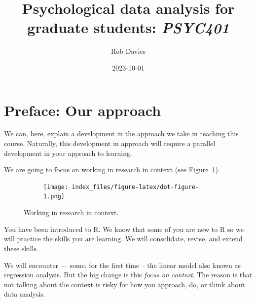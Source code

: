 \documentclass[
  letterpaper,
  DIV=11,
  numbers=noendperiod]{scrreprt}
\title{Psychological data analysis for graduate students:
\emph{PSYC401}}
\author{Rob Davies}
\date{2023-10-01}
\renewcommand*\contentsname{Table of contents}
\newcommand\contentsname{Table of contents}
\begin{document}
\maketitle
\ifdefined\Shaded\renewenvironment{Shaded}{\begin{tcolorbox}[sharp corners, frame hidden, enhanced, boxrule=0pt, interior hidden, breakable, borderline west={3pt}{0pt}{shadecolor}]}{\end{tcolorbox}}\fi

\renewcommand*\contentsname{Table of contents}
{
\hypersetup{linkcolor=}
\setcounter{tocdepth}{2}
\tableofcontents
}

\hypertarget{preface-our-approach}{%
\chapter*{Preface: Our approach}\label{preface-our-approach}}


We can, here, explain a development in the approach we take in teaching
this course. Naturally, this development in approach will require a
parallel development in your approach to learning.

We are going to focus on working in research in context (see
Figure~\ref{fig-simple}).

\begin{figure}

{\centering 

\begin{figure}[H]

{\centering \texttt{[image: index\_files/figure-latex/dot-figure-1.png]}

}

\end{figure}

}

\caption{\label{fig-simple}Working in research in context.}

\end{figure}

You have been introduced to R. We know that some of you are new to R so
we will practice the skills you are learning. We will consolidate,
revise, and extend these skills.

We will encounter --- some, for the first time -- the linear model also
known as regression analysis. But the big change is this \emph{focus on
context}. The reason is that not talking about the context is risky for
how you approach, do, or think about data analysis.
\end{document}
